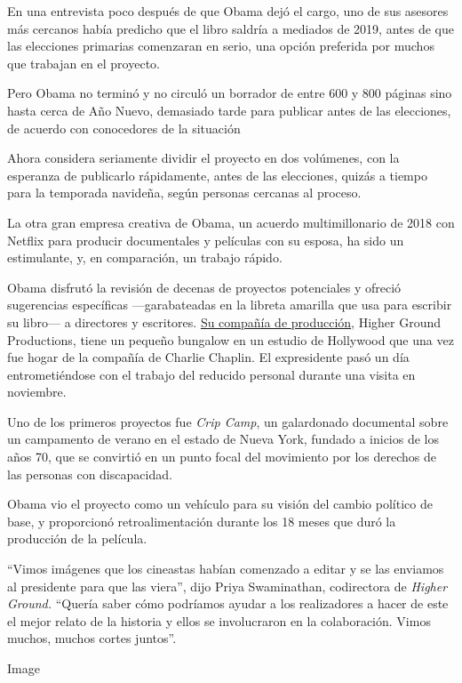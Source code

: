En una entrevista poco después de que Obama dejó el cargo, uno de sus
asesores más cercanos había predicho que el libro saldría a mediados de
2019, antes de que las elecciones primarias comenzaran en serio, una
opción preferida por muchos que trabajan en el proyecto.

Pero Obama no terminó y no circuló un borrador de entre 600 y 800
páginas sino hasta cerca de Año Nuevo, demasiado tarde para publicar
antes de las elecciones, de acuerdo con conocedores de la situación

Ahora considera seriamente dividir el proyecto en dos volúmenes, con la
esperanza de publicarlo rápidamente, antes de las elecciones, quizás a
tiempo para la temporada navideña, según personas cercanas al proceso.

La otra gran empresa creativa de Obama, un acuerdo multimillonario de
2018 con Netflix para producir documentales y películas con su esposa,
ha sido un estimulante, y, en comparación, un trabajo rápido.

Obama disfrutó la revisión de decenas de proyectos potenciales y ofreció
sugerencias específicas ---garabateadas en la libreta amarilla que usa
para escribir su libro--- a directores y escritores.
\href{https://www.nytimes.com/2019/04/30/business/media/obama-netflix-shows.html}{Su
compañía de producción}, Higher Ground Productions, tiene un pequeño
bungalow en un estudio de Hollywood que una vez fue hogar de la compañía
de Charlie Chaplin. El expresidente pasó un día entrometiéndose con el
trabajo del reducido personal durante una visita en noviembre.

Uno de los primeros proyectos fue \emph{Crip Camp}, un galardonado
documental sobre un campamento de verano en el estado de Nueva York,
fundado a inicios de los años 70, que se convirtió en un punto focal del
movimiento por los derechos de las personas con discapacidad.

Obama vio el proyecto como un vehículo para su visión del cambio
político de base, y proporcionó retroalimentación durante los 18 meses
que duró la producción de la película.

``Vimos imágenes que los cineastas habían comenzado a editar y se las
enviamos al presidente para que las viera'', dijo Priya Swaminathan,
codirectora de \emph{Higher Ground.} ``Quería saber cómo podríamos
ayudar a los realizadores a hacer de este el mejor relato de la historia
y ellos se involucraron en la colaboración. Vimos muchos, muchos cortes
juntos''.

Image

